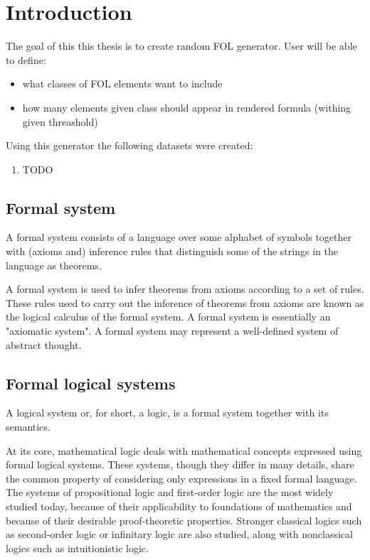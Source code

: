 \chapter{Introduction}

The goal of this this thesis is to create random \gls{FOL} generator. User will be able to define:
\begin{itemize}
\item what classes of \gls{FOL} elements want to include
\item how many elements given class should appear in rendered formula (withing given threashold)
\end{itemize}

Using this generator the following datasets were created:
\begin{enumerate}
  \item TODO
\end{enumerate}

\section{Formal system}
A formal system consists of a language over some alphabet of symbols together with (axioms and) inference rules that distinguish some of the strings in the language as theorems.

A formal system is used to infer theorems from axioms according to a set of rules. These rules used to carry out the inference of theorems from axioms are known as the logical calculus of the formal system. A formal system is essentially an "axiomatic system". A formal system may represent a well-defined system of abstract thought.

\section{Formal logical systems}

A logical system or, for short, a logic, is a formal system together with its semantics.

At its core, mathematical logic deals with mathematical concepts expressed using formal logical systems. These systems, though they differ in many details, share the common property of considering only expressions in a fixed formal language. The systems of propositional logic and first-order logic are the most widely studied today, because of their applicability to foundations of mathematics and because of their desirable proof-theoretic properties. Stronger classical logics such as second-order logic or infinitary logic are also studied, along with nonclassical logics such as intuitionistic logic. 

